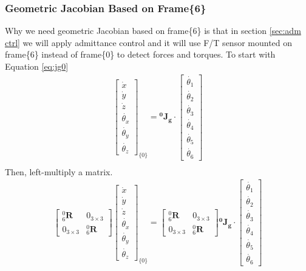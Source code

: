 \subsubsection{Geometric Jacobian Based on Frame\{6\}}
\label{sec:jg6}
\hspace*{6mm}Why we need geometric Jacobian based on frame\{6\} is that in section \ref{sec:adm ctrl} we will apply admittance control and it will use F/T sensor mounted on frame\{6\} instead of frame\{0\} to detect forces and torques. To start with Equation \ref{eq:jg0}
\begin{equation}
\begin{split}
\begin{bmatrix}
\dot{x}\\
\dot{y}\\
\dot{z}\\
\dot{\theta _x}\\
\dot{\theta _y}\\
\dot{\theta _z}
\end{bmatrix}_{\!\{0\}}
=
\mathbf{^0\!J_g} \cdot 
\begin{bmatrix}
\dot{\theta _1} \\ 
\dot{\theta _2} \\ 
\dot{\theta _3} \\ 
\dot{\theta _4} \\ 
\dot{\theta _5} \\ 
\dot{\theta _6} 
\end{bmatrix}\\
\end{split}
\end{equation}
Then, left-multiply a matrix. 
\begin{equation}
\label{eq:jg6_leftmul}
\begin{split}
\begin{bmatrix}
^0_6\mathbf{R} & 0_{ 3\times 3} \\ 
0_{ 3\times 3} & ^0_6\mathbf{R}
\end{bmatrix}
\begin{bmatrix}
\dot{x}\\
\dot{y}\\
\dot{z}\\
\dot{\theta _x}\\
\dot{\theta _y}\\
\dot{\theta _z}
\end{bmatrix}_{\!\{0\}}
=
\begin{bmatrix}
^0_6\mathbf{R} & 0_{ 3\times 3} \\ 
0_{ 3\times 3} & ^0_6\mathbf{R}
\end{bmatrix}
\mathbf{^0\!J_g} \cdot 
\begin{bmatrix}
\dot{\theta _1} \\ 
\dot{\theta _2} \\ 
\dot{\theta _3} \\ 
\dot{\theta _4} \\ 
\dot{\theta _5} \\ 
\dot{\theta _6} 
\end{bmatrix}\\
\end{split}
\end{equation}
